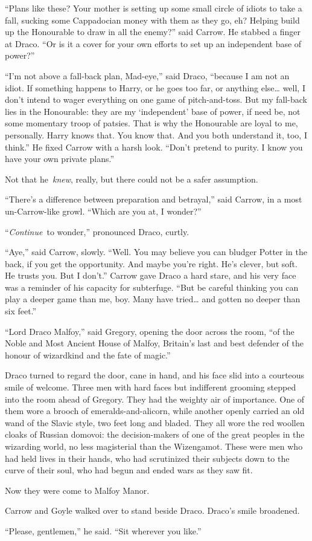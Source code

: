 ``Plans like these? Your mother is setting up some small circle of
idiots to take a fall, sucking some Cappadocian money with them as they
go, eh? Helping build up the Honourable to draw in all the enemy?'' said
Carrow. He stabbed a finger at Draco. ``Or is it a cover for your own
efforts to set up an independent base of power?''

``I'm not above a fall-back plan, Mad-eye,'' said Draco, ``because I am
not an idiot. If something happens to Harry, or he goes too far, or
anything else\ldots{} well, I don't intend to wager everything on one
game of pitch-and-toss. But my fall-back lies in the Honourable: they
are my `independent' base of power, if need be, not some momentary troop
of patsies. That is why the Honourable are loyal to me, personally.
Harry knows that. You know that. And you both understand it, too, I
think.'' He fixed Carrow with a harsh look. ``Don't pretend to purity. I
know you have your own private plans.''

Not that he~\emph{knew}, really, but there could not be a safer
assumption.

``There's a difference between preparation and betrayal,'' said Carrow,
in a most un-Carrow-like growl. ``Which are you at, I wonder?''

``\emph{Continue}~to wonder,'' pronounced Draco, curtly.

``Aye,'' said Carrow, slowly. ``Well. You may believe you can bludger
Potter in the back, if you get the opportunity. And maybe you're right.
He's clever, but soft. He trusts you. But I don't.'' Carrow gave Draco a
hard stare, and his very face was a reminder of his capacity for
subterfuge. ``But be careful thinking you can play a deeper game than
me, boy. Many have tried\ldots{} and gotten no deeper than six feet.''

``Lord Draco Malfoy,'' said Gregory, opening the door across the room,
``of the Noble and Most Ancient House of Malfoy, Britain's last and best
defender of the honour of wizardkind and the fate of magic.''

Draco turned to regard the door, cane in hand, and his face slid into a
courteous smile of welcome. Three men with hard faces but indifferent
grooming stepped into the room ahead of Gregory. They had the weighty
air of importance. One of them wore a brooch of emeralds-and-alicorn,
while another openly carried an old wand of the Slavic style, two feet
long and bladed. They all wore the red woollen cloaks of Russian
domovoi: the decision-makers of one of the great peoples in the
wizarding world, no less magisterial than the Wizengamot. These were men
who had held lives in their hands, who had scrutinized their subjects
down to the curve of their soul, who had begun and ended wars as they
saw fit.

Now they were come to Malfoy Manor.

Carrow and Goyle walked over to stand beside Draco. Draco's smile
broadened.

``Please, gentlemen,'' he said. ``Sit wherever you like.''

\Stopbonus
